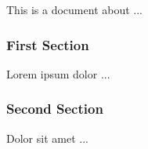 
This is a document about ...

\subsubsection{First Section}

Lorem ipsum dolor ...

\subsubsection{Second Section}

Dolor sit amet ...
